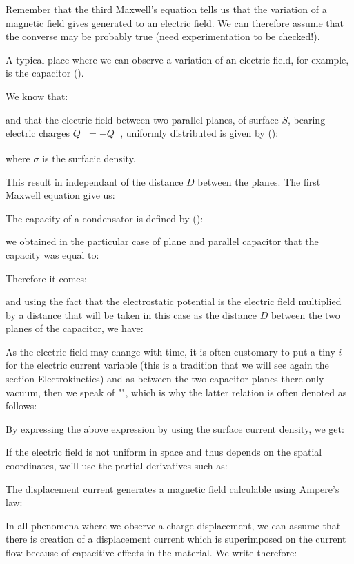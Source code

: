 	Remember that the third Maxwell's equation tells us that the variation of a magnetic field gives generated to an electric field. We can therefore assume that the converse may be probably true (need experimentation to be checked!).
	
	A typical place where we can observe a variation of an electric field, for example, is the capacitor ().
	
	We know that:
	
	and that the electric field between two parallel planes, of surface $S$, bearing electric charges $Q_+=-Q_-$, uniformly distributed is given by ():
	
	where $\sigma$ is the surfacic density.

	This result in independant of the distance $D$ between the planes. The first Maxwell equation give us:
	
	The capacity of a condensator is defined by ():
	
	we obtained in the particular case of plane and parallel capacitor that the capacity was equal to:
	
	Therefore it comes:
	
	and using the fact that the electrostatic potential is the electric field multiplied by a distance that will be taken in this case as the distance $D$ between the two planes of the capacitor, we have:
	
	As the electric field may change with time, it is often customary to put a tiny $i$ for the electric current variable (this is a tradition that we will see again the section Electrokinetics) and as between the two capacitor planes there only vacuum, then we speak of "", which is why the latter relation is often denoted as follows:
	
	By expressing the above expression by using the surface current density, we get:
	
	If the electric field is not uniform in space and thus depends on the spatial coordinates, we'll use the partial derivatives such as:
	
	The displacement current generates a magnetic field calculable using Ampere's law:
	
	In all phenomena where we observe a charge displacement, we can assume that there is creation of a displacement current which is superimposed on the current flow because of capacitive effects in the material. We write therefore:
	
